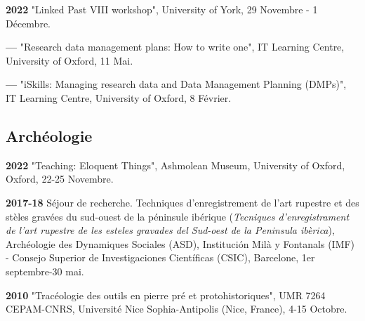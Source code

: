 \documentclass{article}
\newcommand{\fr}[1]{#1}       %
\newcommand{\en}[1]{}     %
\begin{document}
\smallbreak
\textbf{2022 }
\fr{"Linked Past VIII workshop", University of York, 29 Novembre - 1 Décembre.}
\en{"Linked Past VIII Workshop", University of York, November 29 - December 1.}

\smallbreak
\textbf{--- }
\fr{"Research data management plans: How to write one", IT Learning Centre, University of Oxford, 11 Mai.}
\en{"Research Data Management Plans: How to Write One", IT Learning Centre, University of Oxford, May 11.}

\smallbreak
\textbf{--- }
\fr{"iSkills: Managing research data and Data Management Planning (DMPs)", IT Learning Centre, University of Oxford, 8 Février.}
\en{"iSkills: Managing Research Data and Data Management Planning (DMPs)", IT Learning Centre, University of Oxford, February 8.}

\smallbreak

\subsection*{\fr{Archéologie}\en{Archaeology}}

\textbf{2022 }
\fr{"Teaching: Eloquent Things", Ashmolean Museum, University of Oxford, Oxford, 22-25 Novembre.}
\en{"Teaching: Eloquent Things", Ashmolean Museum, University of Oxford, Oxford, November 22-25.}

\smallbreak
\textbf{2017-18}
\fr{Séjour de recherche. Techniques d'enregistrement de l'art rupestre et des stèles gravées du sud-ouest de la péninsule ibérique (\textit{Tecniques d'enregistrament de l'art rupestre de les esteles gravades del Sud-oest de la Peninsula ibèrica}), Archéologie des Dynamiques Sociales (ASD), Institución Milà y Fontanals (IMF) - Consejo Superior de Investigaciones Científicas (CSIC), Barcelone, 1er septembre-30 mai.}
\en{Research Stay. Recording Techniques of Rock Art and Engraved Steles of the Southwestern Iberian Peninsula (\textit{Tecniques d'enregistrament de l'art rupestre de les esteles gravades del Sud-oest de la Peninsula ibèrica}), Archaeology of Social Dynamics (ASD), Institución Milà y Fontanals (IMF) - Spanish National Research Council (CSIC), Barcelona, September 1-May 30.}

\smallbreak
\textbf{2010 }
\fr{"Tracéologie des outils en pierre pré et protohistoriques", UMR 7264 CEPAM-CNRS, Université Nice Sophia-Antipolis (Nice, France), 4-15 Octobre.}
\en{"Traceology of Pre and Protohistoric Stone Tools", UMR 7264 CEPAM-CNRS, University of Nice Sophia-Antipolis (Nice, France), October 4-15.}
\end{document}
